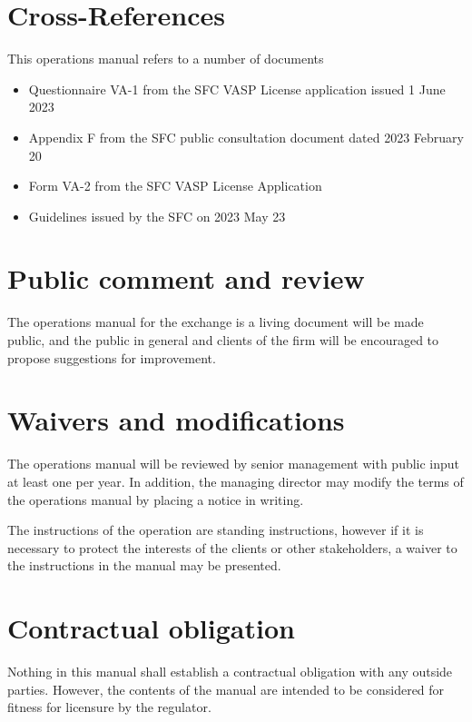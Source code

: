\section{Cross-References}
This operations manual refers to a number of documents
\begin{itemize}
  \item Questionnaire VA-1 from the SFC VASP License application
    issued 1 June 2023
  \item Appendix F from the SFC public consultation document dated
    2023 February 20
  \item Form VA-2 from the SFC VASP License Application
  \item Guidelines issued by the SFC on 2023 May 23
\end{itemize}

\section{Public comment and review}
The operations manual for the exchange is a living document will be
made public, and the public in general and clients of the firm will be
encouraged to propose suggestions for improvement.

\section{Waivers and modifications}
The operations manual will be reviewed by senior management with
public input at least one per year.  In addition, the managing
director may modify the terms of the operations manual by placing a
notice in writing.

The instructions of the operation are standing instructions, however
if it is necessary to protect the interests of the
clients or other stakeholders, a waiver to the instructions in the
manual may be presented.

\section{Contractual obligation}
Nothing in this manual shall establish a contractual obligation with
any outside parties.  However, the contents of the manual are intended
to be considered for fitness for licensure by the regulator.

